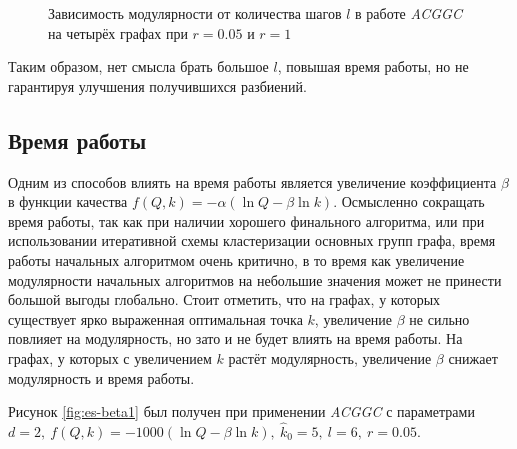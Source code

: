 \begin{figure}[H]
	\caption{Зависимость модулярности от количества шагов $l$ в работе \emph{ACGGC} на четырёх графах при $r = 0.05$ и $r = 1$}
	\label{fig:es-l-q}
\end{figure}

Таким образом, нет смысла брать большое $l$, повышая время работы, но не гарантируя улучшения получившихся разбиений.


\subsection{Время работы}
\label{subsec:acggc_time}

Одним из способов влиять на время работы является увеличение коэффициента $\beta$ в функции качества $f(Q, k) = -\alpha(\ln Q - \beta \ln k)$. Осмысленно сокращать время работы, так как при наличии хорошего финального алгоритма, или при использовании итеративной схемы кластеризации основных групп графа, время работы начальных алгоритмом очень критично, в то время как увеличение модулярности начальных алгоритмов на небольшие значения может не принести большой выгоды глобально. Стоит отметить, что на графах, у которых существует ярко выраженная оптимальная точка $k$, увеличение $\beta$ не сильно повлияет на модулярность, но зато и не будет влиять на время работы. На графах, у которых с увеличением $k$ растёт модулярность, увеличение $\beta$ снижает модулярность и время работы.

Рисунок \ref{fig:es-beta1} был получен при применении \emph{ACGGC} с параметрами $d = 2,\ f(Q, k) = -1000(\ln Q - \beta \ln k),\ \hat{k}_0 = 5,\ l = 6,\ r = 0.05$.

